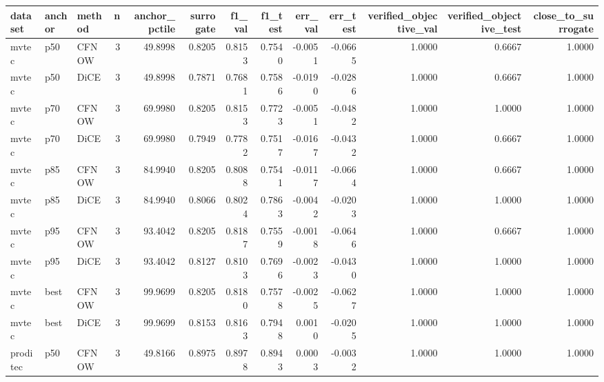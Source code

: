 \begin{tabular}{lllrrrrrrrrrr}
\toprule
 dataset & anchor & method &  n &  anchor\_pctile &  surrogate &  f1\_val &  f1\_test &  err\_val &  err\_test &  verified\_objective\_val &  verified\_objective\_test &  close\_to\_surrogate \\
\midrule
   mvtec &    p50 &  CFNOW &  3 &        49.8998 &     0.8205 &  0.8153 &   0.7540 &  -0.0051 &   -0.0665 &                  1.0000 &                   0.6667 &              1.0000 \\
   mvtec &    p50 &   DiCE &  3 &        49.8998 &     0.7871 &  0.7681 &   0.7586 &  -0.0190 &   -0.0286 &                  1.0000 &                   0.6667 &              1.0000 \\
   mvtec &    p70 &  CFNOW &  3 &        69.9980 &     0.8205 &  0.8153 &   0.7723 &  -0.0051 &   -0.0482 &                  1.0000 &                   1.0000 &              1.0000 \\
   mvtec &    p70 &   DiCE &  3 &        69.9980 &     0.7949 &  0.7782 &   0.7517 &  -0.0167 &   -0.0432 &                  1.0000 &                   0.6667 &              1.0000 \\
   mvtec &    p85 &  CFNOW &  3 &        84.9940 &     0.8205 &  0.8088 &   0.7541 &  -0.0117 &   -0.0664 &                  1.0000 &                   0.6667 &              1.0000 \\
   mvtec &    p85 &   DiCE &  3 &        84.9940 &     0.8066 &  0.8024 &   0.7863 &  -0.0042 &   -0.0203 &                  1.0000 &                   1.0000 &              1.0000 \\
   mvtec &    p95 &  CFNOW &  3 &        93.4042 &     0.8205 &  0.8187 &   0.7559 &  -0.0018 &   -0.0646 &                  1.0000 &                   0.6667 &              1.0000 \\
   mvtec &    p95 &   DiCE &  3 &        93.4042 &     0.8127 &  0.8103 &   0.7696 &  -0.0023 &   -0.0430 &                  1.0000 &                   1.0000 &              1.0000 \\
   mvtec &   best &  CFNOW &  3 &        99.9699 &     0.8205 &  0.8180 &   0.7578 &  -0.0025 &   -0.0627 &                  1.0000 &                   1.0000 &              1.0000 \\
   mvtec &   best &   DiCE &  3 &        99.9699 &     0.8153 &  0.8163 &   0.7948 &   0.0010 &   -0.0205 &                  1.0000 &                   1.0000 &              1.0000 \\
proditec &    p50 &  CFNOW &  3 &        49.8166 &     0.8975 &  0.8978 &   0.8943 &   0.0003 &   -0.0032 &                  1.0000 &                   1.0000 &              1.0000 \\

\end{tabular}
